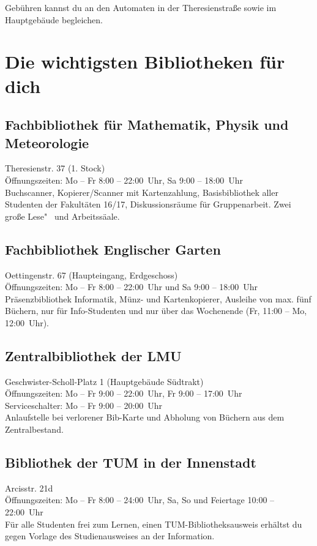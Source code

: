 Gebühren kannst du an den Automaten in der Theresienstraße sowie
im Hauptgebäude begleichen.

\begin{urlList}
\end{urlList}

\section{Die wichtigsten Bibliotheken für dich}

\subsection*{Fachbibliothek für Mathematik, Physik und Meteorologie}
Theresienstr. 37 (1. Stock)\\
Öffnungszeiten: Mo -- Fr 8:00 -- 22:00~Uhr, Sa 9:00 -- 18:00~Uhr\\
Buchscanner, Kopierer/Scanner mit Kartenzahlung, Basisbibliothek aller
Studenten der Fakultäten 16/17, Diskussionsräume für Gruppenarbeit.
Zwei große Lese"~ und Arbeitssäale.

\subsection*{Fachbibliothek Englischer Garten}
Oettingenstr. 67 (Haupteingang, Erdgeschoss)\\
Öffnungszeiten: Mo -- Fr 8:00 -- 22:00~Uhr und Sa 9:00 -- 18:00~Uhr\\
Präsenzbibliothek Informatik, Münz- und Kartenkopierer, Ausleihe von max. fünf Büchern, nur für Info-Studenten und nur über das Wochenende (Fr, 11:00 -- Mo, 12:00~Uhr).

\subsection*{Zentralbibliothek der LMU}
Geschwister-Scholl-Platz 1 (Hauptgebäude Südtrakt)\\
Öffnungszeiten: Mo -- Fr 9:00 -- 22:00~Uhr, Fr 9:00 -- 17:00~Uhr\\
Serviceschalter: Mo -- Fr 9:00 -- 20:00~Uhr\\
Anlaufstelle bei verlorener Bib-Karte und Abholung von Büchern aus dem Zentralbestand.

\subsection*{Bibliothek der TUM in der Innenstadt}
Arcisstr. 21d\\
Öffnungszeiten: Mo -- Fr 8:00 -- 24:00~Uhr, Sa, So und Feiertage 10:00 -- 22:00~Uhr\\
Für alle Studenten frei zum Lernen, einen TUM-Bibliotheksausweis erhältst du gegen Vorlage des Studienausweises an der Information.

